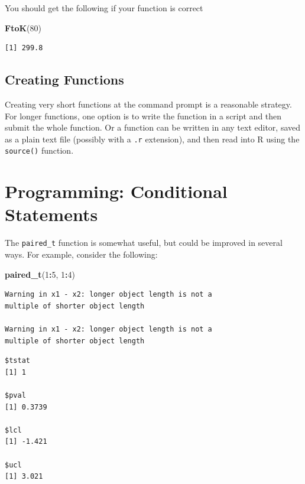 \documentclass[
]{krantz}
\makeatletter
\newenvironment{Shaded}{\begin{snugshade}}{\end{snugshade}}
\newcommand{\DecValTok}[1]{\textcolor[rgb]{0.06,0.06,0.06}{#1}}
\newcommand{\KeywordTok}[1]{\textcolor[rgb]{0.27,0.27,0.27}{\textbf{#1}}}
\newcommand{\NormalTok}[1]{#1}
\newcommand{\OperatorTok}[1]{\textcolor[rgb]{0.43,0.43,0.43}{\textbf{#1}}}
\newenvironment{kframe}{%
\medskip{}
\setlength{\fboxsep}{.8em}
 \def\at@end@of@kframe{}%
 \ifinner\ifhmode%
  \def\at@end@of@kframe{\end{minipage}}%
  \begin{minipage}{\columnwidth}%
 \fi\fi%
 \def\FrameCommand##1{\hskip\@totalleftmargin \hskip-\fboxsep
 \colorbox{shadecolor}{##1}\hskip-\fboxsep
     \hskip-\linewidth \hskip-\@totalleftmargin \hskip\columnwidth}%
 \MakeFramed {\advance\hsize-\width
   \@totalleftmargin\z@ \linewidth\hsize
   \@setminipage}}%
 {\par\unskip\endMakeFramed%
 \at@end@of@kframe}
\renewenvironment{Shaded}{\begin{kframe}}{\end{kframe}}
\makeatother
\begin{document}
You should get the following if your function is correct

\begin{Shaded}
\begin{Highlighting}[]
\KeywordTok{FtoK}\NormalTok{(}\DecValTok{80}\NormalTok{)}
\end{Highlighting}
\end{Shaded}

\begin{verbatim}
[1] 299.8
\end{verbatim}

\hypertarget{creating-functions}{%
\subsection{Creating Functions}\label{creating-functions}}

Creating very short functions at the command prompt is a reasonable strategy. For longer functions, one option is to write the function in a script and then submit the whole function. Or a function can be written in any text editor, saved as a plain text file (possibly with a \texttt{.r} extension), and then read into R using the \texttt{source()} function.

\hypertarget{programming-conditional-statements}{%
\section{Programming: Conditional Statements}\label{programming-conditional-statements}}

The \texttt{paired\_t} function is somewhat useful, but could be improved in several ways. For example, consider the following:

\begin{Shaded}
\begin{Highlighting}[]
\KeywordTok{paired\_t}\NormalTok{(}\DecValTok{1}\OperatorTok{:}\DecValTok{5}\NormalTok{, }\DecValTok{1}\OperatorTok{:}\DecValTok{4}\NormalTok{)}
\end{Highlighting}
\end{Shaded}

\begin{verbatim}
Warning in x1 - x2: longer object length is not a
multiple of shorter object length

Warning in x1 - x2: longer object length is not a
multiple of shorter object length
\end{verbatim}

\begin{verbatim}
$tstat
[1] 1

$pval
[1] 0.3739

$lcl
[1] -1.421

$ucl
[1] 3.021
\end{verbatim}
\end{document}
